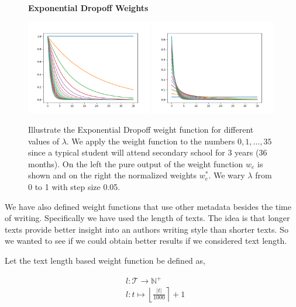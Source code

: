 \begin{figure}
    \centering
    \textbf{Exponential Dropoff Weights}\par\medskip
    \includegraphics[width=0.49\textwidth]{./pictures/method/weights.png}
    \includegraphics[width=0.49\textwidth]{./pictures/method/weights_normalized.png}
    \caption{Illustrate the Exponential Dropoff weight function for different
        values of $\lambda$. We apply the weight function to the numbers $0, 1,
        \dots, 35$ since a typical student will attend secondary school for 3
        years (36 months). On the left the pure output of the weight function
        $w_e$ is shown and on the right the normalized weights $w_e^*$. We wary
        $\lambda$ from 0 to 1 with step size 0.05.}
    \label{fig:weights}
\end{figure}

We have also defined weight functions that use other metadata besides the time
of writing. Specifically we have used the length of texts. The idea is that
longer texts provide better insight into an authors writing style than shorter
texts. So we wanted to see if we could obtain better results if we considered
text length.

\begin{definition}

    Let the text length based weight function be defined as,

    \begin{align}
        &l \colon \mathcal{T} \rightarrow \mathbb{N}^+ \\
        &l \colon t \mapsto \left\lfloor \frac{|t|}{1000} \right\rceil + 1
    \end{align}

\end{definition}


